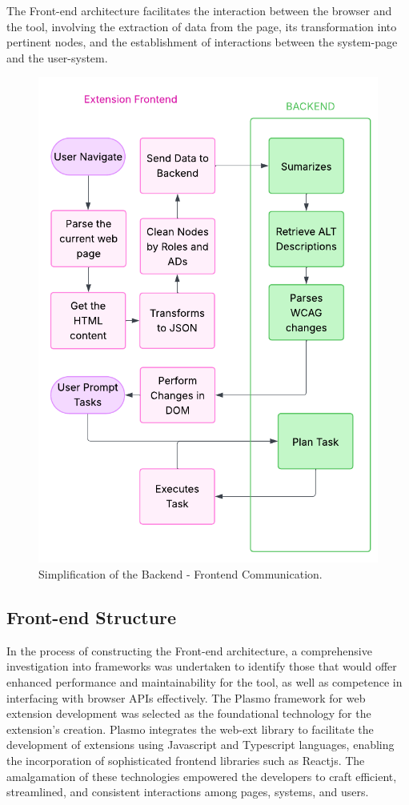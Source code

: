 \documentclass[conference]{IEEEtran}
\begin{document}
The Front-end architecture facilitates the interaction between the browser and the tool, involving the extraction of data from the page, its transformation into pertinent nodes, and the establishment of interactions between the system-page and the user-system.

\begin{figure}[h]
\centering
\includegraphics[width=\columnwidth]{images/5.pdf}
\caption{Simplification of the Backend - Frontend Communication.}
\label{fig:communication}
\end{figure}

\subsection{Front-end Structure}

In the process of constructing the Front-end architecture, a comprehensive investigation into frameworks was undertaken to identify those that would offer enhanced performance and maintainability for the tool, as well as competence in interfacing with browser APIs effectively. The Plasmo framework for web extension development was selected as the foundational technology for the extension's creation. Plasmo integrates the web-ext library to facilitate the development of extensions using Javascript and Typescript languages, enabling the incorporation of sophisticated frontend libraries such as Reactjs. The amalgamation of these technologies empowered the developers to craft efficient, streamlined, and consistent interactions among pages, systems, and users.
\end{document}
